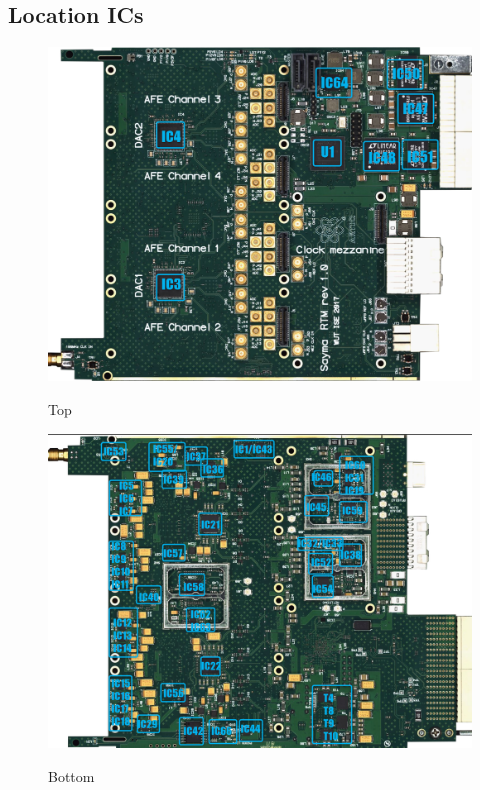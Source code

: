 \subsection{Location ICs}

		\begin{figure}[htbp!]
			\centering
			\includegraphics[width=12cm]{img/TU1.png}\\
			\caption{Top}
		\end{figure}
		\begin{figure}[htbp!]
			\centering
			\includegraphics[width=12cm]{img/BU1.png}\\
			\caption{Bottom}
		\end{figure}
\clearpage

